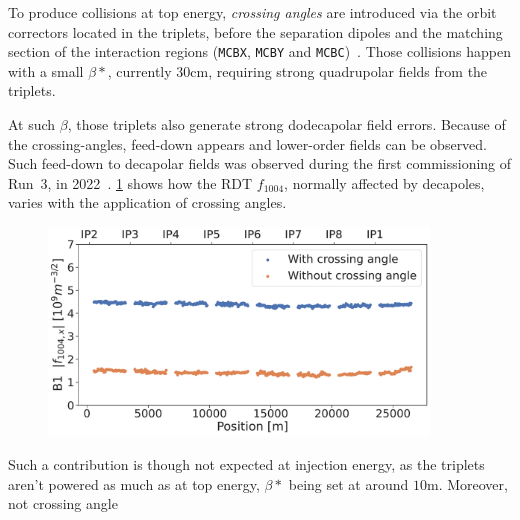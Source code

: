 To produce collisions at top energy, \textit{crossing angles} are introduced via the orbit
correctors located in the triplets, before the separation dipoles and the matching section of the
interaction regions (\texttt{MCBX}, \texttt{MCBY} and \texttt{MCBC})~\cite{de_maria_lhc_2008}. Those
collisions happen with a small $\beta*$, currently 30cm, requiring strong quadrupolar fields from
the triplets.

At such $\beta$, those triplets also generate strong dodecapolar field errors. Because of the
crossing-angles, feed-down appears and lower-order fields can be observed.
Such feed-down to decapolar fields was observed during the first commissioning of Run~3, in
2022~\cite{maclean_prospects_2022}.
\cref{fig:decapoles:f1004_from_feeddown} shows how the RDT $f_{1004}$, normally affected by
decapoles, varies with the application of crossing angles.

\begin{figure}[H]
    \centering
    \includegraphics[width=0.9\textwidth]{./images/f1004x_feed-down_b6_triplets.pdf}
    \caption{}
    \label{fig:decapoles:f1004_from_feeddown}
\end{figure}

Such a contribution is though not expected at injection energy, as the triplets aren't powered as
much as at top energy, $\beta*$ being set at around $10$m. Moreover, not crossing angle

\subsection{}


